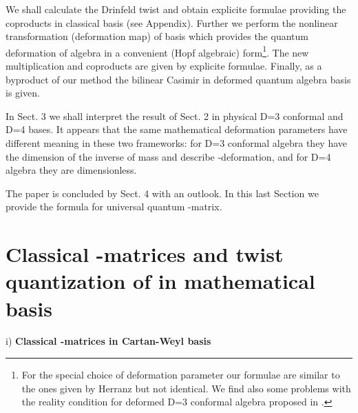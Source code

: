 \documentclass[a4paper,12pt,showkeys]{article}
\begin{document}
     We shall calculate the Drinfeld twist and obtain
     explicite formulae providing the coproducts in classical
     \coordHE{} basis (see Appendix).
       Further   we  perform the nonlinear
     transformation (deformation map) of \coordHE{} basis which
     provides the quantum    deformation of \coordHE{}  algebra
     in a convenient (Hopf algebraic)
     form\footnote{For the special choice
     of deformation parameter our formulae are
     similar to the ones  given by Herranz
      \cite{ll8}  but not
     identical. We find also some problems with the reality condition for
     deformed D=3 conformal algebra proposed in
     \cite{ll8}.}.
     The new multiplication and coproducts  are
     given by explicite formulae.  Finally, as a byproduct of our
     method the bilinear Casimir in
      deformed quantum \coordHE{}
algebra  basis     is given.


     In Sect. 3 we shall interpret the result of
     Sect. 2 in physical D=3 conformal and D=4 \coordHE{} bases.
      It appears
      that the
        same mathematical
       deformation parameters have different meaning
       in these two frameworks: for D=3 conformal algebra
       they have
       the dimension of the inverse of mass and describe
        \myHighlight{$\kappa$}\coordHE{}-deformation, and for D=4 \coordHE{}  algebra
       they are  dimensionless.


     The paper is concluded by Sect. 4 with an outlook.
     In this last Section we provide the formula for
     universal quantum \coordHE{}-matrix.



\section{Classical \coordHE{}  \coordHE{}-matrices
 and twist quantization of \coordHE{} in mathematical basis}

\setcounter{equation}{0}

 i) {\bf Classical \coordHE{}  \coordHE{}-matrices in Cartan-Weyl basis}
\end{document}
